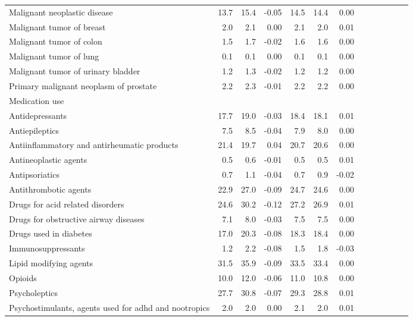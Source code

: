 \documentclass[11pt,]{article}
\begin{document}
\begin{longtable}{lrrrrrrrrrrrr}
      Malignant neoplastic disease & 13.7 &  15.4 & -0.05 & 14.5 & 14.4 &  0.00 \\ 
      Malignant tumor of breast &  2.0 &   2.1 &  0.00 &  2.1 &  2.0 &  0.01 \\ 
      Malignant tumor of colon &  1.5 &   1.7 & -0.02 &  1.6 &  1.6 &  0.00 \\ 
      Malignant tumor of lung &  0.1 &   0.1 &  0.00 &  0.1 &  0.1 &  0.00 \\ 
      Malignant tumor of urinary bladder &  1.2 &   1.3 & -0.02 &  1.2 &  1.2 &  0.00 \\ 
      Primary malignant neoplasm of prostate &  2.2 &   2.3 & -0.01 &  2.2 &  2.2 &  0.00 \\ 
  Medication use &    &     &     &    &    &     \\ 
      Antidepressants & 17.7 &  19.0 & -0.03 & 18.4 & 18.1 &  0.01 \\ 
      Antiepileptics &  7.5 &   8.5 & -0.04 &  7.9 &  8.0 &  0.00 \\ 
      Antiinflammatory and antirheumatic products & 21.4 &  19.7 &  0.04 & 20.7 & 20.6 &  0.00 \\ 
      Antineoplastic agents &  0.5 &   0.6 & -0.01 &  0.5 &  0.5 &  0.01 \\ 
      Antipsoriatics &  0.7 &   1.1 & -0.04 &  0.7 &  0.9 & -0.02 \\ 
      Antithrombotic agents & 22.9 &  27.0 & -0.09 & 24.7 & 24.6 &  0.00 \\ 
      Drugs for acid related disorders & 24.6 &  30.2 & -0.12 & 27.2 & 26.9 &  0.01 \\ 
      Drugs for obstructive airway diseases &  7.1 &   8.0 & -0.03 &  7.5 &  7.5 &  0.00 \\ 
      Drugs used in diabetes & 17.0 &  20.3 & -0.08 & 18.3 & 18.4 &  0.00 \\ 
      Immunosuppressants &  1.2 &   2.2 & -0.08 &  1.5 &  1.8 & -0.03 \\ 
      Lipid modifying agents & 31.5 &  35.9 & -0.09 & 33.5 & 33.4 &  0.00 \\ 
      Opioids & 10.0 &  12.0 & -0.06 & 11.0 & 10.8 &  0.00 \\ 
      Psycholeptics & 27.7 &  30.8 & -0.07 & 29.3 & 28.8 &  0.01 \\ 
      Psychostimulants, agents used for adhd and nootropics &  2.0 &   2.0 &  0.00 &  2.1 &  2.0 &  0.01 \\ 
   \bottomrule\end{longtable}
\clearpage
{}
\end{document}
